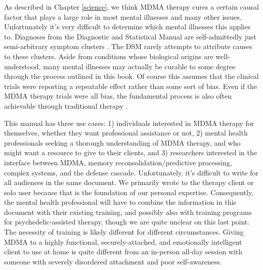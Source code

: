 \documentclass[12pt,letterpaper]{book}
\begin{document}

As described in Chapter \ref{science}, we think MDMA therapy cures a certain causal factor that plays a large role in most mental illnesses and many other issues. Unfortunately it's very difficult to determine which mental illnesses this applies to. Diagnoses from the Diagnostic and Statistical Manual are self-admittedly just semi-arbitrary symptom clusters \cite{apaDSM}. The DSM rarely attempts to attribute causes to these clusters. Aside from conditions whose biological origins are well-understood, many mental illnesses may actually be curable to some degree through the process outlined in this book. Of course this assumes that the clinical trials were reporting a repeatable effect rather than some sort of bias. Even if the MDMA therapy trials were all bias, the fundamental process is also often achievable through traditional therapy \cite{eckerUnlocking}.

This manual has three use cases: 1) individuals interested in MDMA therapy for themselves, whether they want professional assistance or not, 2) mental health professionals seeking a thorough understanding of MDMA therapy, and who might want a resource to give to their clients, and 3) researchers interested in the interface between MDMA, memory reconsolidation/predictive processing, complex systems, and the defense cascade. Unfortunately, it's difficult to write for all audiences in the same document. We primarily wrote to the therapy client or solo user because that is the foundation of our personal expertise. Consequently, the mental health professional will have to combine the information in this document with their existing training, and possibly also with training programs for psychedelic-assisted therapy, though we are quite unclear on this last point. The necessity of training is likely different for different circumstances. Giving MDMA to a highly functional, securely-attached, and emotionally intelligent client to use at home is quite different from an in-person all-day session with someone with severely disordered attachment and poor self-awareness.
\end{document}
